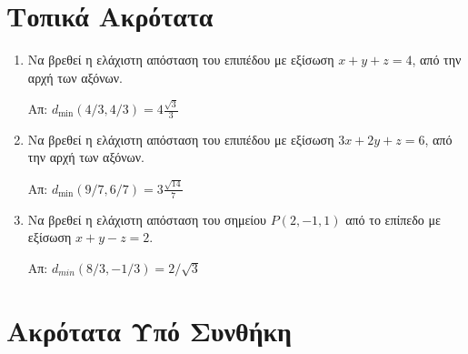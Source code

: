 \documentclass[a4paper,table]{report}
\begin{document}
\begin{center}
  \minibox{\large \bfseries \textcolor{Col1}{Ασκήσεις στα Ακρότατα}}
\end{center}

\vspace{\baselineskip}

\section*{Τοπικά Ακρότατα}

\begin{enumerate}

\item Να βρεθεί η ελάχιστη απόσταση του επιπέδου με εξίσωση $ x+y+z=4 $, από την 
  αρχή των αξόνων.

  \hfill Απ: $ d_{\min}(4/3,4/3) = 4\frac{\sqrt{3}}{3} $  

\item Να βρεθεί η ελάχιστη απόσταση του επιπέδου με εξίσωση $ 3x+2y+z=6 $, από την 
  αρχή των αξόνων.

  \hfill Απ: $ d_{\min}(9/7,6/7) = 3\frac{\sqrt{14}}{7} $  

\item Να βρεθεί η ελάχιστη απόσταση του σημείου $ P(2,-1,1) $ από το επίπεδο με 
  εξίσωση $ x+y-z=2 $. 

  \hfill Απ: $ d_{min}(8/3,-1/3) = 2 /\sqrt{3} $ 



\end{enumerate}


\section*{Ακρότατα Υπό Συνθήκη}
\end{document}
